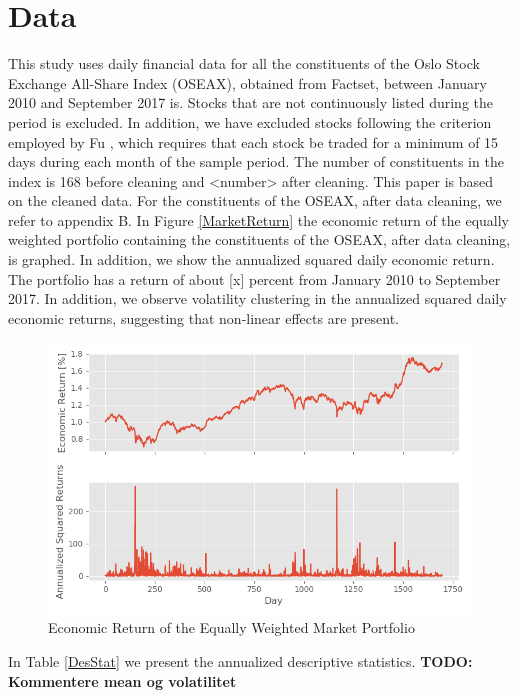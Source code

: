 \chapter{Data}
\label{Da}

This study uses daily financial data for all the constituents of the Oslo Stock Exchange All-Share Index (OSEAX), obtained from Factset, between January 2010 and September 2017 is. Stocks that are not continuously listed during the period is excluded. In addition, we have excluded stocks following the criterion employed by Fu \cite{Fu}, which requires that each stock be traded for a minimum of 15 days during each month of the sample period. The number of constituents in the index is 168 before cleaning and <number> after cleaning. This paper is based on the cleaned data. For the constituents of the OSEAX, after data cleaning, we refer to appendix B. In Figure \ref{MarketReturn} the economic return of the equally weighted portfolio containing the constituents of the OSEAX, after data cleaning, is graphed. In addition, we show the annualized squared daily economic return. The portfolio has a return of about [x] percent from January 2010 to September 2017. In addition, we observe volatility clustering in the annualized squared daily economic returns, suggesting that non-linear effects are present.

\begin{figure}[h]
\label{MarketReturn}
    \centering
    \includegraphics[scale = 0.65]{Plot/MarketReturn.png}
    \caption{Economic Return of the Equally Weighted Market Portfolio}
    \label{Scatter regression}
\end{figure}

In Table \ref{DesStat} we present the annualized descriptive statistics.
\textbf{TODO: Kommentere mean og volatilitet}

